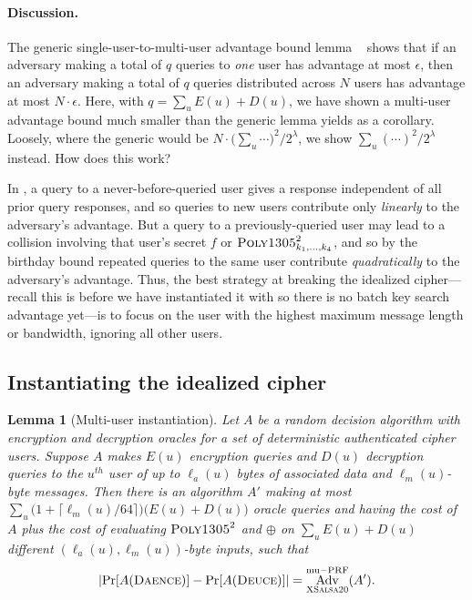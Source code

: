 \documentclass[draft]{article}
\newtheorem{lemma}{Lemma}
\DeclareRobustCommand{\operatorsc}[1]{{%
  \ifmmode\let\next=\operatorname\else\let\next=\relax\fi\next{\textsc{#1}}}}
\def\XSalsa#1/{\operatorsc{XSalsa#1}}
\def\Poly#1/{\operatorsc{Poly#1}}
\def\Daence/{\operatorsc{Daence}}
\def\Deuce/{\operatorsc{Deuce}}
\DeclareMathOperator{\Adv}{Adv}
\DeclareMathOperator{\muPRF}{mu-PRF}
\begin{document}
\paragraph*{Discussion.}
The generic single-user-to-multi-user advantage bound lemma%
 ~\cite[Lemma~3.3]{bellare-canetti-krawczyk1996cascade}%
  \cite[Lemma~1]{bellare-bernstein-tessaro2016amac-mu}
 shows that if an adversary making a total of $q$ queries to \emph{one}
 user has advantage at most $\epsilon$, then an adversary making a
 total of $q$ queries distributed across $N$ users has advantage at
 most $N\cdot\epsilon$.
Here, with $q = \sum_u E(u) + D(u)$, we have shown a multi-user
 advantage bound much smaller than the generic lemma yields as
 a corollary.
Loosely, where the generic would be
 $N\cdot \bigl(\sum_u \cdots\bigr)^2\!/2^\lambda$,
 we show
 $\sum_u (\cdots)^2\!/2^\lambda$
 instead.
How does this work?

In \Deuce/, a query to a never-before-queried user gives a response
 independent of all prior query responses, and so queries to new users
 contribute only \emph{linearly} to the adversary's advantage.
But a query to a previously-queried user may lead to a collision
 involving that user's secret $f$ or $\Poly1305/^2_{k_1,\dotsc,k_4}$,
 and so by the birthday bound repeated queries to the same user
 contribute \emph{quadratically} to the adversary's advantage.
Thus, the best strategy at breaking the idealized cipher---recall this
 is before we have instantiated it with \XSalsa20/ so there is no batch
 key search advantage yet---is to focus on the user with the highest
 maximum message length or bandwidth, ignoring all other users.

\subsection{Instantiating the idealized cipher}

\begin{lemma}[Multi-user instantiation]\label{lem-mu-instance}
  Let $A$ be a random decision algorithm with encryption and
   decryption oracles for a \emph{set} of deterministic authenticated
   cipher users.
  Suppose $A$ makes $E(u)$ encryption queries and $D(u)$ decryption
   queries to the $u^{\mathit{th}}$ user of up to $\ell_a(u)$ bytes of
   associated data and $\ell_m(u)$-byte messages.
  Then there is an algorithm $A'$ making at most
   $\sum_u \bigl(1 + \lceil\ell_m(u)/64\rceil\bigr)
     \bigl(E(u) + D(u)\bigr)$
   oracle queries and having the cost of $A$ plus the cost of
   evaluating $\Poly1305/^2$ and $\oplus$ on
   $\sum_u E(u) + D(u)$
   different $(\ell_a(u), \ell_m(u))$-byte inputs,
   such that
  \[
    \lvert\Pr[A(\Daence/)] - \Pr[A(\Deuce/)]\rvert
    = \Adv^{\muPRF}_{\XSalsa20/}(A').
  \]
\end{lemma}
\end{document}
